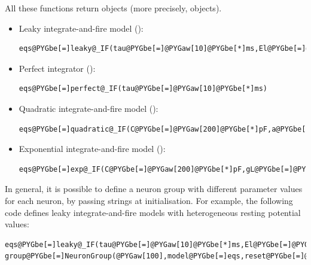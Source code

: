 \documentclass[letterpaper,10pt,english]{manual}
\begin{document}
All these functions return \hyperlink{brian.Equations}{} objects (more precisely,  objects).
\begin{itemize}
\item {} 
Leaky integrate-and-fire model ():

\begin{Verbatim}[commandchars=@\[\]]
eqs@PYGbe[=]leaky@_IF(tau@PYGbe[=]@PYGaw[10]@PYGbe[*]ms,El@PYGbe[=]@PYGbe[-]@PYGaw[70]@PYGbe[*]mV)
\end{Verbatim}

\item {} 
Perfect integrator ():

\begin{Verbatim}[commandchars=@\[\]]
eqs@PYGbe[=]perfect@_IF(tau@PYGbe[=]@PYGaw[10]@PYGbe[*]ms)
\end{Verbatim}

\item {} 
Quadratic integrate-and-fire model ():

\begin{Verbatim}[commandchars=@\[\]]
eqs@PYGbe[=]quadratic@_IF(C@PYGbe[=]@PYGaw[200]@PYGbe[*]pF,a@PYGbe[=]@PYGaw[10]@PYGbe[*]nS@PYGbe[/]mV,EL@PYGbe[=]@PYGbe[-]@PYGaw[70]@PYGbe[*]mV,VT@PYGbe[=]@PYGbe[-]@PYGaw[50]@PYGbe[*]mV)
\end{Verbatim}

\item {} 
Exponential integrate-and-fire model ():

\begin{Verbatim}[commandchars=@\[\]]
eqs@PYGbe[=]exp@_IF(C@PYGbe[=]@PYGaw[200]@PYGbe[*]pF,gL@PYGbe[=]@PYGaw[10]@PYGbe[*]nS,EL@PYGbe[=]@PYGbe[-]@PYGaw[70]@PYGbe[*]mV,VT@PYGbe[=]@PYGbe[-]@PYGaw[55]@PYGbe[*]mV,DeltaT@PYGbe[=]@PYGaw[3]@PYGbe[*]mV)
\end{Verbatim}

\end{itemize}

In general, it is possible to define a neuron group with different parameter values for each neuron, by
passing strings at initialisation. For example, the following code defines leaky integrate-and-fire models
with heterogeneous resting potential values:

\begin{Verbatim}[commandchars=@\[\]]
eqs@PYGbe[=]leaky@_IF(tau@PYGbe[=]@PYGaw[10]@PYGbe[*]ms,El@PYGbe[=]@PYGad[']@PYGad[V0]@PYGad['])@PYGbe[+]Equations(@PYGad[']@PYGad[V0:volt]@PYGad['])
group@PYGbe[=]NeuronGroup(@PYGaw[100],model@PYGbe[=]eqs,reset@PYGbe[=]@PYGaw[0]@PYGbe[*]mV,threshold@PYGbe[=]@PYGaw[15]@PYGbe[*]mV)
\end{Verbatim}
\end{document}
